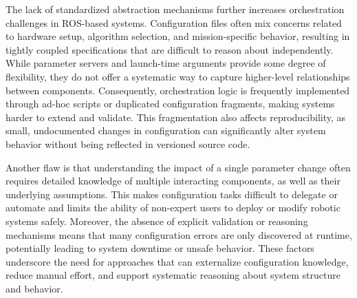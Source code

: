 The lack of standardized abstraction mechanisms further increases orchestration challenges in ROS-based systems. Configuration files often mix 
concerns related to hardware setup, algorithm selection, and mission-specific behavior, resulting in tightly coupled specifications that are 
difficult to reason about independently. While parameter servers and launch-time arguments provide some degree of flexibility, they do not offer
a systematic way to capture higher-level relationships between components. Consequently, orchestration logic is frequently implemented through ad-hoc
scripts or duplicated configuration fragments, making systems harder to extend and validate. This fragmentation also affects reproducibility, as small,
undocumented changes in configuration can significantly alter system behavior without being reflected in versioned source code. 

Another flaw is that understanding the impact of a single parameter change often requires detailed knowledge of multiple interacting components, as well as their 
underlying assumptions. This makes configuration tasks difficult to delegate or automate and limits the ability of non-expert users to deploy or 
modify robotic systems safely. Moreover, the absence of explicit validation or reasoning mechanisms means that many configuration errors are only 
discovered at runtime, potentially leading to system downtime or unsafe behavior. These factors underscore the need for approaches that can externalize
configuration knowledge, reduce manual effort, and support systematic reasoning about system structure and behavior.